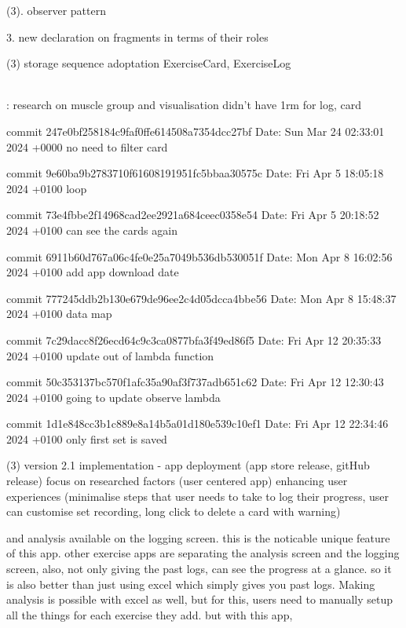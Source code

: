 (3). observer pattern 


3. new declaration on fragments in terms of their roles

(3) storage sequence adoptation 
    ExerciseCard, ExerciseLog






\\ : 
research on muscle group and visualisation
didn't have 1rm for log, card


commit 247e0bf258184c9faf0ffe614508a7354dcc27bf
Date:   Sun Mar 24 02:33:01 2024 +0000
    no need to filter card

commit 9e60ba9b2783710f61608191951fc5bbaa30575c
Date:   Fri Apr 5 18:05:18 2024 +0100
    loop

commit 73e4fbbe2f14968cad2ee2921a684ceec0358e54
Date:   Fri Apr 5 20:18:52 2024 +0100
    can see the cards again

commit 6911b60d767a06c4fe0e25a7049b536db530051f
Date:   Mon Apr 8 16:02:56 2024 +0100
    add app download date

commit 777245ddb2b130e679de96ee2c4d05dcca4bbe56
Date:   Mon Apr 8 15:48:37 2024 +0100
    data map

commit 7c29dacc8f26ecd64c9c3ca0877bfa3f49ed86f5
Date:   Fri Apr 12 20:35:33 2024 +0100
    update out of lambda function

commit 50c353137bc570f1afc35a90af3f737adb651c62
Date:   Fri Apr 12 12:30:43 2024 +0100
    going to update observe lambda


commit 1d1e848cc3b1c889e8a14b5a01d180e539c10ef1
Date:   Fri Apr 12 22:34:46 2024 +0100
    only first set is saved


(3) version 2.1 implementation - app deployment (app store release, gitHub release)
focus on researched factors (user centered app)
enhancing user experiences
(minimalise steps that user needs to take to log their progress, user can customise set recording, long click to delete a card with warning)


and analysis available on the logging screen. 
this is the noticable unique feature of this app. 
other exercise apps are separating the analysis screen and the logging screen, 
also, not only giving the past logs, can see the progress at a glance. 
so it is also better than just using excel which simply gives you past logs.
Making analysis is possible with excel as well, but for this, users need to manually setup all the things for each exercise they add.
but with this app, 



